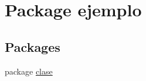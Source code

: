 \hypertarget{namespaceejemplo}{}\section{Package ejemplo}
\label{namespaceejemplo}
\subsection*{Packages}
\begin{DoxyCompactItemize}
\item 
package \mbox{\hyperlink{namespaceejemplo_1_1clase}{clase}}
\end{DoxyCompactItemize}
